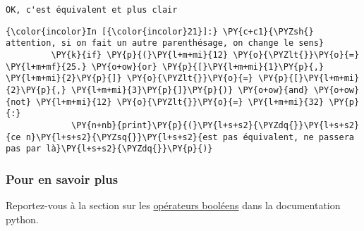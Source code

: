     \begin{Verbatim}[commandchars=\\\{\}]
OK, c'est équivalent et plus clair

    \end{Verbatim}

    \begin{Verbatim}[commandchars=\\\{\}]
{\color{incolor}In [{\color{incolor}21}]:} \PY{c+c1}{\PYZsh{} attention, si on fait un autre parenthésage, on change le sens}
         \PY{k}{if} \PY{p}{(}\PY{l+m+mi}{12} \PY{o}{\PYZlt{}}\PY{o}{=} \PY{l+m+mf}{25.} \PY{o+ow}{or} \PY{p}{[}\PY{l+m+mi}{1}\PY{p}{,} \PY{l+m+mi}{2}\PY{p}{]} \PY{o}{\PYZlt{}}\PY{o}{=} \PY{p}{[}\PY{l+m+mi}{2}\PY{p}{,} \PY{l+m+mi}{3}\PY{p}{]}\PY{p}{)} \PY{o+ow}{and} \PY{o+ow}{not} \PY{l+m+mi}{12} \PY{o}{\PYZlt{}}\PY{o}{=} \PY{l+m+mi}{32} \PY{p}{:}
             \PY{n+nb}{print}\PY{p}{(}\PY{l+s+s2}{\PYZdq{}}\PY{l+s+s2}{ce n}\PY{l+s+s2}{\PYZsq{}}\PY{l+s+s2}{est pas équivalent, ne passera pas par là}\PY{l+s+s2}{\PYZdq{}}\PY{p}{)}
\end{Verbatim}


    \hypertarget{pour-en-savoir-plus}{%
\subsubsection{Pour en savoir plus}\label{pour-en-savoir-plus}}

    Reportez-vous à la section sur les
\href{https://docs.python.org/3/library/stdtypes.html\#truth-value-testing}{opérateurs
booléens} dans la documentation python.